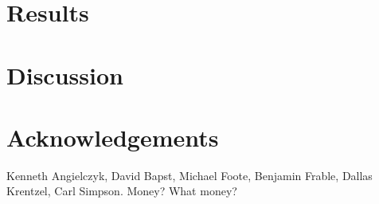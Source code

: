 \documentclass[12pt,letterpaper]{article}
\begin{document}
%
%


\section{Results}


\section{Discussion}


\section*{Acknowledgements}
Kenneth Angielczyk, David Bapst, Michael Foote, Benjamin Frable, Dallas Krentzel, Carl Simpson. Money? What money?



\end{document}
